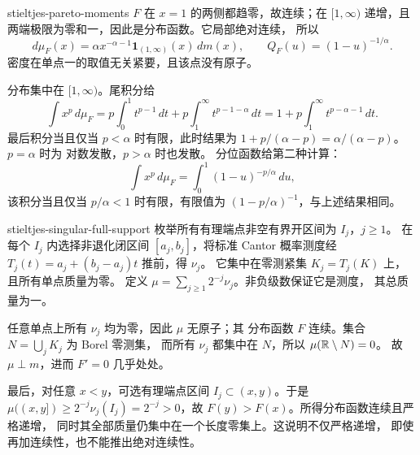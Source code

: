 \begin{solution}{stieltjes-pareto-moments}
\(F\) 在 \(x=1\) 的两侧都趋零，故连续；在 \([1,\infty)\)
递增，且两端极限为零和一，因此是分布函数。它局部绝对连续，
所以
\[
 d\mu_F(x)=\alpha x^{-\alpha-1}\mathbf1_{(1,\infty)}(x)\,dm(x),
 \qquad Q_F(u)=(1-u)^{-1/\alpha}.
\]
密度在单点一的取值无关紧要，且该点没有原子。

分布集中在 \([1,\infty)\)。尾积分给
\[
 \int x^p\,d\mu_F
 =p\int_0^1t^{p-1}\,dt
   +p\int_1^\infty t^{p-1-\alpha}\,dt
 =1+p\int_1^\infty t^{p-\alpha-1}\,dt.
\]
最后积分当且仅当 \(p<\alpha\) 时有限，此时结果为
\(1+p/(\alpha-p)=\alpha/(\alpha-p)\)。\(p=\alpha\) 时为
对数发散，\(p>\alpha\) 时也发散。
分位函数给第二种计算：
\[
 \int x^p\,d\mu_F=\int_0^1(1-u)^{-p/\alpha}\,du,
\]
该积分当且仅当 \(p/\alpha<1\) 时有限，有限值为
\((1-p/\alpha)^{-1}\)，与上述结果相同。
\end{solution}

\begin{solution}{stieltjes-singular-full-support}
枚举所有有理端点非空有界开区间为 \(I_j\)，\(j\ge1\)。
在每个 \(I_j\) 内选择非退化闭区间 \([a_j,b_j]\)，将标准
Cantor 概率测度经 \(T_j(t)=a_j+(b_j-a_j)t\) 推前，得 \(\nu_j\)。
它集中在零测紧集 \(K_j=T_j(K)\) 上，且所有单点质量为零。
定义 \(\mu=\sum_{j\ge1}2^{-j}\nu_j\)。非负级数保证它是测度，
其总质量为一。

任意单点上所有 \(\nu_j\) 均为零，因此 \(\mu\) 无原子；其
分布函数 \(F\) 连续。集合 \(N=\bigcup_jK_j\) 为 Borel 零测集，
而所有 \(\nu_j\) 都集中在 \(N\)，所以 \(\mu(\mathbb{R}\setminus N)=0\)。
故 \(\mu\perp m\)，进而 \(F'=0\) 几乎处处。

最后，对任意 \(x<y\)，可选有理端点区间
\(I_j\subset(x,y)\)。于是 \(\mu((x,y])\ge2^{-j}\nu_j(I_j)
=2^{-j}>0\)，故 \(F(y)>F(x)\)。所得分布函数连续且严格递增，
同时其全部质量仍集中在一个长度零集上。这说明不仅严格递增，
即使再加连续性，也不能推出绝对连续性。
\end{solution}

